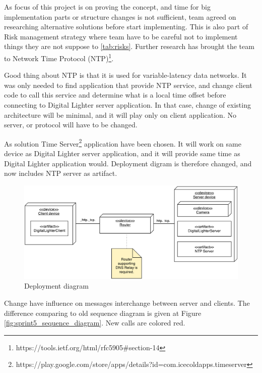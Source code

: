 As focus of this project is on proving the concept, and time for big implementation parts or structure changes is not sufficient, team agreed on researching alternative solutions before start implementing. This is also part of Risk management strategy where team have to be careful not to implement things they are not suppose to \ref{tab:risks}. Further research has brought the team to Network Time Protocol (NTP)\footnote{https://tools.ietf.org/html/rfc5905\#section-14}.

Good thing about NTP is that it is used for variable-latency data networks. It was only needed to find application that provide NTP service, and change client code to call this service and determine what is a local time offset before connecting to Digital Lighter server application. In that case, change of existing architecture will be minimal, and it will play only on client application. No server, or protocol will have to be changed.

As solution Time Server\footnote{https://play.google.com/store/apps/details?id=com.icecoldapps.timeserver} application have been chosen. It will work on same device as Digital Lighter server application, and it will provide same time as Digital Lighter application would. Deployment digram is therefore changed, and now includes NTP server as artifact. 

\begin{figure}[H]
	\centering
		\includegraphics[width=15cm]{images/deployment-diagram-sprint5}
	\caption{Deployment diagram}
	\label{fig:sprint5_deployment_diagram}
\end{figure}

Change have influence on messages interchange between server and clients. The difference comparing to old sequence diagram is given at Figure \ref{fig:sprint5_sequence_diagram}. New calls are colored red. 

